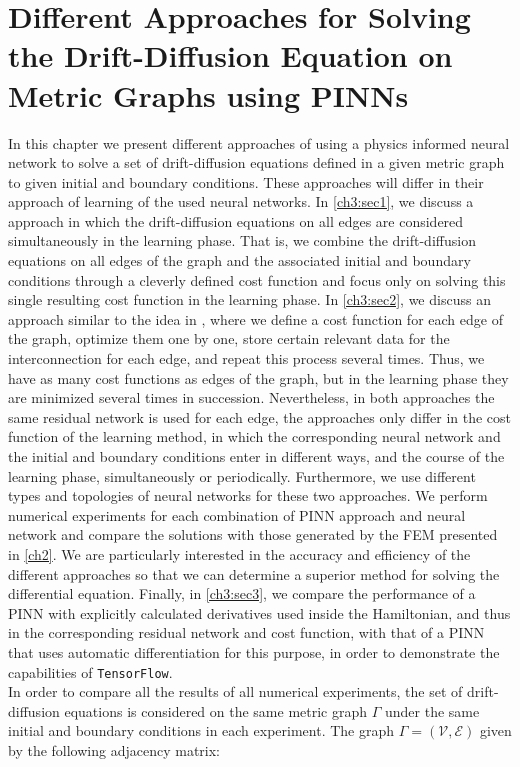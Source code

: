 \chapter{Different Approaches for Solving the Drift-Diffusion Equation on Metric Graphs using PINNs}

In this chapter we present different approaches of using a physics informed neural network to solve a set of drift-diffusion equations defined in a given metric graph to given initial and boundary conditions. These approaches will differ in their approach of learning of the used neural networks. In \cref{ch3:sec1}, we discuss a approach in which the drift-diffusion equations on all edges are considered simultaneously in the learning phase. That is, we combine the drift-diffusion equations on all edges of the graph and the associated initial and boundary conditions through a cleverly defined cost function and focus only on solving this single resulting cost function in the learning phase. In \cref{ch3:sec2}, we discuss an approach similar to the idea in \cite{JagtapKharazmiKarniadakis:2020}, where we define a cost function for each edge of the graph, optimize them one by one, store certain relevant data for the interconnection for each edge, and repeat this process several times. Thus, we have as many cost functions as edges of the graph, but in the learning phase they are minimized several times in succession. Nevertheless, in both approaches the same residual network is used for each edge, the approaches only differ in the cost function of the learning method, in which the corresponding neural network and the initial and boundary conditions enter in different ways, and the course of the learning phase, simultaneously or periodically. Furthermore, we use different types and topologies of neural networks for these two approaches. We perform numerical experiments for each combination of PINN approach and neural network and compare the solutions with those generated by the FEM presented in \cref{ch2}. We are particularly interested in the accuracy and efficiency of the different approaches so that we can determine a superior method for solving the differential equation. Finally, in \cref{ch3:sec3}, we compare the performance of a PINN with explicitly calculated derivatives used inside the Hamiltonian, and thus in the corresponding residual network and cost function, with that of a PINN that uses automatic differentiation for this purpose, in order to demonstrate the capabilities of \lstinline!TensorFlow!. \\
In order to compare all the results of all numerical experiments, the set of drift-diffusion equations is considered on the same metric graph $\Gamma$ under the same initial and boundary conditions in each experiment. The graph $\Gamma = (\mathcal{V}, \mathcal{E})$ given by the following adjacency matrix: 
